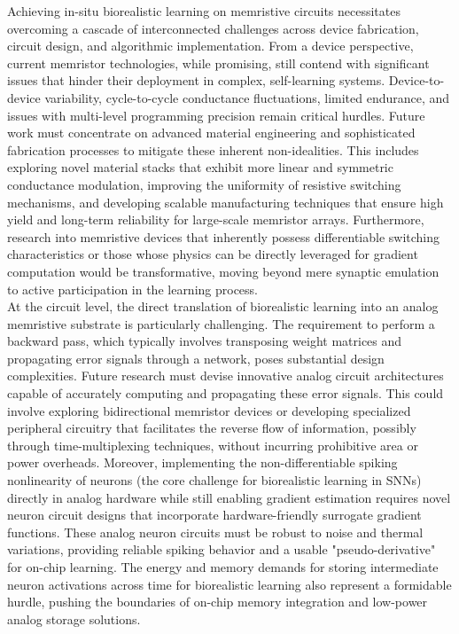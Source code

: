 \noindent Achieving in-situ biorealistic learning on memristive circuits necessitates overcoming a cascade of interconnected challenges across device fabrication, circuit design, and algorithmic implementation. From a device perspective, current memristor technologies, while promising, still contend with significant issues that hinder their deployment in complex, self-learning systems. Device-to-device variability, cycle-to-cycle conductance fluctuations, limited endurance, and issues with multi-level programming precision remain critical hurdles. Future work must concentrate on advanced material engineering and sophisticated fabrication processes to mitigate these inherent non-idealities. This includes exploring novel material stacks that exhibit more linear and symmetric conductance modulation, improving the uniformity of resistive switching mechanisms, and developing scalable manufacturing techniques that ensure high yield and long-term reliability for large-scale memristor arrays. Furthermore, research into memristive devices that inherently possess differentiable switching characteristics or those whose physics can be directly leveraged for gradient computation would be transformative, moving beyond mere synaptic emulation to active participation in the learning process.\\

\noindent At the circuit level, the direct translation of biorealistic learning into an analog memristive substrate is particularly challenging. The requirement to perform a backward pass, which typically involves transposing weight matrices and propagating error signals through a network, poses substantial design complexities. Future research must devise innovative analog circuit architectures capable of accurately computing and propagating these error signals. This could involve exploring bidirectional memristor devices or developing specialized peripheral circuitry that facilitates the reverse flow of information, possibly through time-multiplexing techniques, without incurring prohibitive area or power overheads. Moreover, implementing the non-differentiable spiking nonlinearity of neurons (the core challenge for biorealistic learning in SNNs) directly in analog hardware while still enabling gradient estimation requires novel neuron circuit designs that incorporate hardware-friendly surrogate gradient functions. These analog neuron circuits must be robust to noise and thermal variations, providing reliable spiking behavior and a usable "pseudo-derivative" for on-chip learning. The energy and memory demands for storing intermediate neuron activations across time for biorealistic learning also represent a formidable hurdle, pushing the boundaries of on-chip memory integration and low-power analog storage solutions.\\

